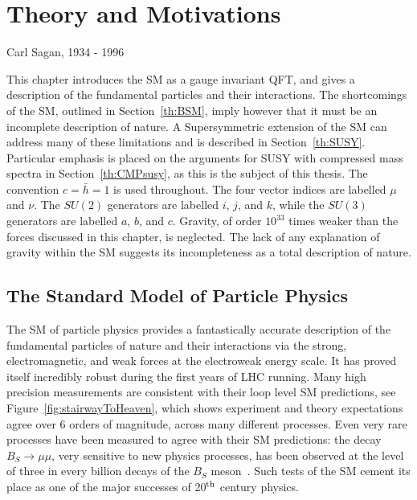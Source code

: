 \chapter{Theory and Motivations}
\label{chap:theory}



{Carl Sagan, 1934 - 1996}%


This chapter introduces the \ac{SM} as a gauge invariant \ac{QFT}, and gives a description of the fundamental particles and their interactions.
The shortcomings of the \ac{SM}, outlined in Section~\ref{th:BSM}, imply however that it must be an incomplete description of nature. 
A Supersymmetric extension of the SM can address many of these limitations and is described in Section~\ref{th:SUSY}. 
Particular emphasis is placed on the arguments for \ac{SUSY} with compressed mass spectra in Section~\ref{th:CMPsusy}, as this is the subject of this thesis.
The convention $c=\bar{h}=1$ is used throughout. 
The four vector indices are labelled $\mu$ and $\nu$.
The $SU(2)$ generators are labelled $i$, $j$, and $k$, while the $SU(3)$ generators are labelled $a$, $b$, and $c$.
Gravity, of order $10^{33}$ times weaker than the forces discussed in this chapter, is neglected.
The lack of any explanation of gravity within the \ac{SM} suggests its incompleteness as a total description of nature.

\section{The Standard Model of Particle Physics \label{th:sm}}

The \ac{SM} of particle physics provides a fantastically accurate description of the fundamental particles of nature and their interactions via the strong, electromagnetic, and weak forces at the electroweak energy scale.
It has proved itself incredibly robust during the first years of \ac{LHC} running. 
Many high precision measurements are consistent with their loop level \ac{SM} predictions, see Figure~\ref{fig:stairwayToHeaven}, which shows 
experiment and theory expectations agree over 6 orders of magnitude, across many different processes.
Even very rare processes have been measured to agree with their \ac{SM} predictions: the decay $B_{S}\rightarrow \mu\mu$, very sensitive to new physics processes, has been observed at the level of three in every billion decays of the $B_{S}$ meson~\cite{BSmumuCombo}.
Such tests of the \ac{SM} cement its place as one of the major successes of 20$^{\rm th}$ century physics.


